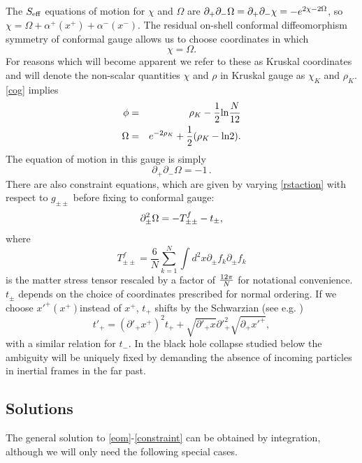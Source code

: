 \documentclass[12pt,oneside,letterpaper]{article}
\newcommand{\f}{\frac}
\newcommand{\be}{\begin{equation}}
\newcommand{\ee}{\end{equation}}
\def\be{\begin{eqnarray}}
\def\ee{\end{eqnarray}}
\newcommand{\bea}{\begin{eqnarray}}
\newcommand{\eea}{\end{eqnarray}}
\let\f=\frac
\def\be{\begin{equation}}
\def\ee{\end{equation}}
\def\del{\partial}
\def\log{{\rm ln}}
\numberwithin{equation}{section}
\def \be {\begin{equation}}
\def \ee {\end{equation}}
\begin{document}
The $S_{\rm eff}$ equations of motion for $\chi$ and $\Omega$ are $\partial_+ \partial_- \Omega = \partial_+ \partial_- \chi= - e^{2 \chi - 2 \Omega}$, so $\chi = \Omega + \alpha^+(x^+) + \alpha^-(x^-)$. The residual on-shell conformal diffeomorphism symmetry of conformal gauge allows us to choose coordinates in which  \be\label{cog} \chi = \Omega.\ee 
For reasons which will become apparent we refer to these as Kruskal coordinates and will denote the non-scalar quantities $\chi$ and $\rho$ in Kruskal gauge as $\chi_K$ and $\rho_K$. \eqref{cog} implies \bea \label{rp} \phi&=&\rho_K - \frac{1}{2}\log \frac{N}{12}\cr \Omega &=& e^{-2\rho_K} + \frac{1}{2}(\rho_K  - \log 2).\eea The equation of motion in this gauge is simply 
\be\label{eom}
\partial_+\partial_- \Omega = -1\,.
\ee
There are also constraint equations, which are given by varying \eqref{rstaction} with respect to $g_{\pm \pm}$ before fixing to conformal gauge:
\be\label{constraint}
\partial_\pm^2 \Omega = -T^{f}_{\pm \pm}-t_\pm \\,
\ee
where 
\be\label{rds}T^f_{\pm\pm}= \f{6}{N}\sum_{k=1}^N\int d^2 x \del_\pm f_k\del_\pm f_k \ee
is the matter stress tensor rescaled by a factor of $12 \pi \over N$ for notational convenience.
 $t_\pm$ depends on the  choice of coordinates prescribed  for normal ordering. If we choose ${x'}^+(x^+)$instead of $x^+$, $t_+$ shifts by the Schwarzian (see e.g. \cite{Fiola:1994ir})
\be\label{sch} t'_+=({\del'}_+ x^+)^2t_++\sqrt{{\del'}_+x}{\del'}_+^2\sqrt{\del_+{x'}^+},\ee
with a similar relation for $t_-$.   In the black hole collapse studied below the ambiguity will be uniquely fixed by 
demanding the absence of incoming particles in inertial frames in the far past. 


\subsection{Solutions}
The general solution to \eqref{eom}-\eqref{constraint} can be obtained by integration, although we will only need the following special cases. 
\end{document}
